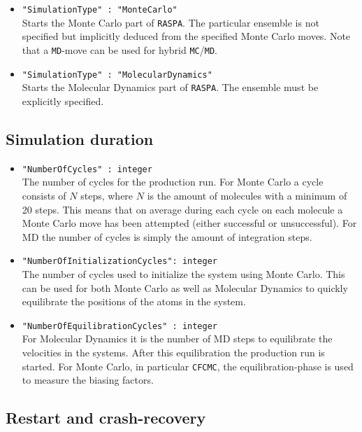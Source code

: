 \begin{itemize}
\item{\verb+"SimulationType" : "MonteCarlo"+}\\
  Starts the Monte Carlo part of \texttt{RASPA}. The particular ensemble is not specified but implicitly deduced from
    the specified Monte Carlo moves. Note that a \texttt{MD}-move can be used for hybrid \texttt{MC}/\texttt{MD}.
\item{\verb+"SimulationType" : "MolecularDynamics"+}\\
  Starts the Molecular Dynamics part of \texttt{RASPA}. The ensemble must be explicitly specified.
\end{itemize}

\subsection{Simulation duration}

\begin{itemize}
\item{\verb+"NumberOfCycles" : integer+}\\
The number of cycles for the production run.
For Monte Carlo a cycle consists of $N$ steps, where $N$ is the amount of
molecules with a minimum of 20 steps. This means that on average during each cycle on each molecule a
Monte Carlo move has been attempted (either successful or unsuccessful). For MD the number of cycles
is simply the amount of integration steps.
\item{\verb+"NumberOfInitializationCycles": integer+}\\
The number of cycles used to initialize the system using Monte Carlo. This can be used for both Monte Carlo
as well as Molecular Dynamics to quickly equilibrate the positions of the atoms in the system.
\item{\verb+"NumberOfEquilibrationCycles" : integer+}\\
For Molecular Dynamics  it is the number of MD steps to equilibrate the velocities in the systems. After this
    equilibration the production run is started. For Monte Carlo, in particular \texttt{CFCMC}, the equilibration-phase is used
to measure the biasing factors.
\end{itemize}

\subsection{Restart and crash-recovery}

